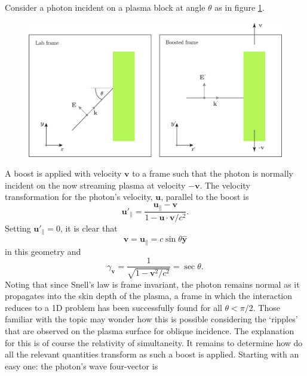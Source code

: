 Consider a photon incident on a plasma block at angle $\theta$ as in figure \ref{fig:miscreferenceframesboosted1d}.
\begin{figure}
	\centering
	\includegraphics[width=1\linewidth]{figures/misc/misc_reference_frames_boosted_1D}
	\caption{}
	\label{fig:miscreferenceframesboosted1d}
\end{figure}
A boost is applied with velocity $\mathbf{v}$ to a frame such that the photon is normally incident on the now streaming plasma at velocity $-\mathbf{v}$. The velocity transformation for the photon's velocity, $\mathbf{u}$, parallel to the boost is
\begin{equation}
	\mathbf{u}'_\parallel = \frac{\mathbf{u}_\parallel - \mathbf{v}}{1-\mathbf{u}\cdot\mathbf{v}/c^2}.
\end{equation}
Setting  $\mathbf{u}'_\parallel = 0$, it is clear that
\begin{equation}
	\mathbf{v} = \mathbf{u}_\parallel = c\sin\theta \hat{\mathbf{y}}
\end{equation}
in this geometry and 
\begin{equation}
	\gamma_\mathbf{v} = \frac{1}{\sqrt{1-\mathbf{v}^2/c^2}}=\sec\theta.
\end{equation}
Noting that since Snell's law is frame invariant, the photon remains normal as it propagates into the skin depth of the plasma, a frame in which the interaction reduces to a 1D problem has been successfully found for all $\theta < \pi/2$. Those familiar with the topic may wonder how this is possible considering the `ripples' that are observed on the plasma surface for oblique incidence. The explanation for this is of course the relativity of simultaneity. It remains to determine how do all the relevant quantities transform as such a boost is applied. Starting with an easy one: the photon's wave four-vector is 
